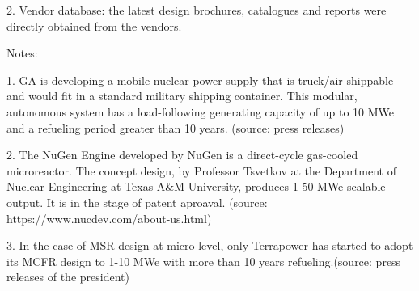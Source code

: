 \documentclass[10pt,a4paper]{article}
\begin{document}
2. Vendor database: the latest design brochures, catalogues and reports were directly obtained from the vendors.

Notes:

1. GA is developing a mobile nuclear power supply that is truck/air shippable and would fit in a standard military shipping container. This modular, autonomous system has a load-following generating capacity of up to 10 MWe and a refueling period greater than 10 years. (source: press releases)

2. The NuGen Engine developed by NuGen is a direct-cycle gas-cooled microreactor. The concept design, by Professor Tsvetkov at the Department of Nuclear Engineering at Texas A$\&$M University, produces 1-50 MWe scalable output. It is in the stage of patent aproaval. (source: https://www.nucdev.com/about-us.html)

3. In the case of MSR design at micro-level, only Terrapower has started to adopt its MCFR design to 1-10 MWe with more than 10 years refueling.(source: press releases of the president) 
\end{document}
